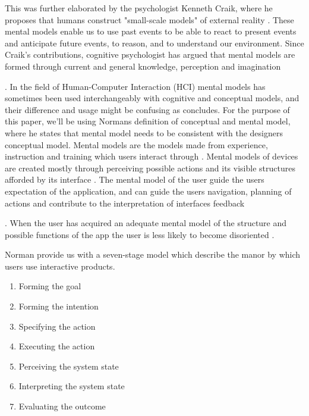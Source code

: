 This was further elaborated by the psychologist Kenneth Craik, where he proposes that humans construct "small-scale models" of external reality \cite{Craik1967}. These mental models enable us to use past events to be able to react to present events and anticipate future events, to reason, and to understand our environment. Since Craik's contributions, cognitive psychologist has argued that mental models are formed through current and general knowledge, perception and imagination \cite{Johnson-Laird2001} . In the field of Human-Computer Interaction (HCI) mental models has sometimes been used interchangeably with cognitive and conceptual models, and their difference and usage might be confusing as \cite{Staggers1993} concludes. For the purpose of this paper, we'll be using Normans \cite{Norman2013a} definition of conceptual and mental model, where he states that mental model needs to be consistent with the designers conceptual model. Mental models are the models made from experience, instruction and training which users interact through \cite{Norman2013a}. Mental models of devices are created mostly through perceiving possible actions and its visible structures afforded by its interface \cite{Norman2013a}. The mental model of the user guide the users expectation of the application, and can guide the users navigation, planning of actions and contribute to the interpretation of interfaces feedback \cite{Jin1992}. When the user has acquired an adequate mental model of the structure and possible functions of the app the user is less likely to become disoriented \cite{Jih1992}.

Norman \cite{Norman2013a} provide us with a seven-stage model which describe the manor by which users use interactive products.
\begin{enumerate}
  \item Forming the goal
  \item Forming the intention
  \item Specifying the action
  \item Executing the action
  \item Perceiving the system state
  \item Interpreting the system state
  \item Evaluating the outcome
\end{enumerate}

